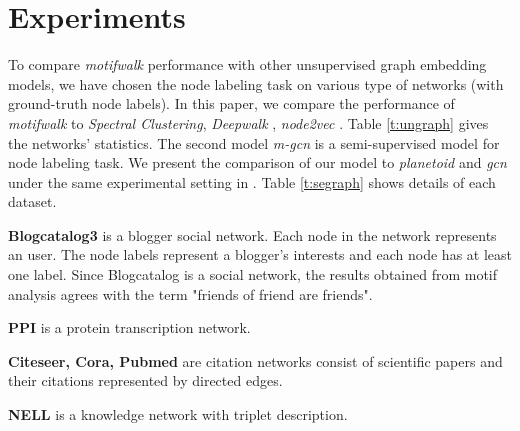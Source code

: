 \documentclass{article}
\theoremstyle{definition}
\begin{document}
\section{Experiments}

To compare \emph{motifwalk} performance with other unsupervised graph
embedding models, we have chosen the node labeling task on various
type of networks (with ground-truth node labels). In this paper, we
compare the performance of \emph{motifwalk} to 
\emph{Spectral Clustering}, 
\emph{Deepwalk} \cite{deepwalk}, \emph{node2vec} \cite{node2vec}. Table \ref{t:ungraph}
gives the networks' statistics. The second model \emph{m-gcn} is a semi-supervised model for node
labeling task. We present the comparison of our model to \emph{planetoid} and
\emph{gcn} under the same experimental setting in \cite{gcn}. Table \ref{t:segraph}
shows details of each dataset.

\textbf{Blogcatalog3} \cite{blogcatalog} is a blogger social network. Each node
in the network represents an user. The node labels represent a blogger's interests and
each node has at least one label. Since Blogcatalog is a social network, the results
obtained from motif analysis agrees with the term "friends of friend are friends".

\textbf{PPI} \cite{PPI} is a protein transcription network.

\textbf{Citeseer, Cora, Pubmed} \cite{citeseer,cora,pubmed} are citation networks 
consist of scientific papers and their citations represented by directed edges.

\textbf{NELL} \cite{NELL} is a knowledge network with triplet description.

\begin{table}[H]
\centering
{}
\caption{Datasets for unsupervised embeddings}
\label{t:ungraph}
\end{table}
\end{document}
